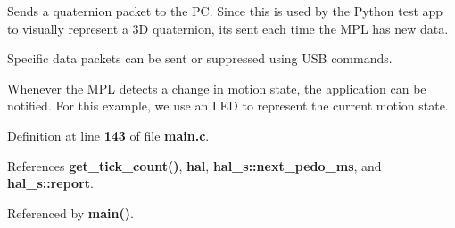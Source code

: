 Sends a quaternion packet to the PC. Since this is used by the Python test app to visually represent a 3D quaternion, it\textquotesingle{}s sent each time the M\+PL has new data.

Specific data packets can be sent or suppressed using U\+SB commands.

Whenever the M\+PL detects a change in motion state, the application can be notified. For this example, we use an L\+ED to represent the current motion state.

Definition at line \textbf{ 143} of file \textbf{ main.\+c}.



References \textbf{ get\+\_\+tick\+\_\+count()}, \textbf{ hal}, \textbf{ hal\+\_\+s\+::next\+\_\+pedo\+\_\+ms}, and \textbf{ hal\+\_\+s\+::report}.



Referenced by \textbf{ main()}.


